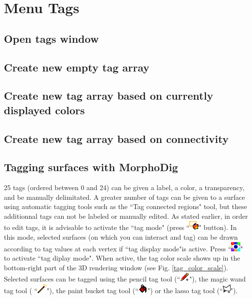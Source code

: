 
\chapter{Menu Tags}\label{tags_chapter}
\minitoc 




\section{Open tags window}
\section{Create new empty tag array}
\section{Create new tag array based on currently displayed colors}
\section{Create new tag array based on connectivity}

\section{Tagging surfaces with MorphoDig}
25 tags (ordered between 0 and 24) can be given
a label, a color, a transparency, and be manually
delimitated. A greater number of tags can be given
to a surface using automatic tagging tools such as the ``Tag connected regions" tool, but these
additionnal tags can not be labeled or manually edited. As stated earlier, in order to edit tags, it is advisable to activate the ``tag mode" (press ``\includegraphics[scale=0.7]{images/pixmap/Tag_select_mode.png}" button). In this mode, selected surfaces (on which you can interact and tag) can be drawn according to tag values at each vertex if ``tag display mode"is active. Press ``\includegraphics[scale=0.7]{images/pixmap/Show_Tag_Window.png}" to activate ``tag diplay mode". When active, the tag color scale shows up in the bottom-right part of the 3D rendering window (see Fig. \ref{tag_color_scale}). Selected surfaces can be tagged using the pencil tag tool (``\includegraphics[scale=0.7]{images/pixmap/pencil.png}"), the magic wand tag tool ( ``\includegraphics[scale=0.7]{images/pixmap/magic_wand.png}"), the paint bucket tag tool (``\includegraphics[scale=0.7]{images/pixmap/Flood_fill.png}") or the lasso tag tool (``\includegraphics[scale=0.7]{images/pixmap/Lasso_plus.png}").

